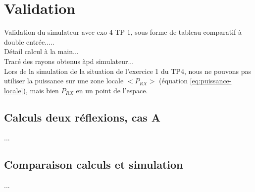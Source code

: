 \chapter{Validation}
\label{chaper-3}

Validation du simulateur avec exo 4 TP 1, sous forme de tableau comparatif à double entrée.....\\
Détail calcul à la main...\\
Tracé des rayons obtenus àpd simulateur...\\





Lors de la simulation de la situation de l'exercice 1 du TP4, nous ne pouvons pas utiliser la puissance sur une zone locale $<P_{RX}>$ (équation \ref{eq:puissance-locale}), mais bien $P_{RX}$ en un point de l'espace.

\section{Calculs deux réflexions, cas A}
...


\section{Comparaison calculs et simulation}
...


